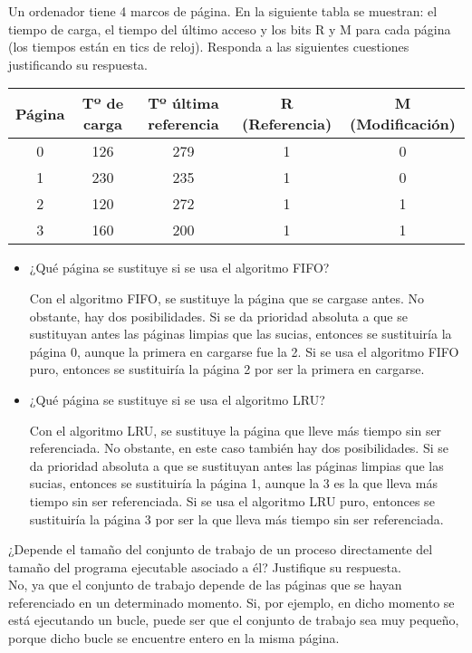 \begin{ejercicio}
Un ordenador tiene 4 marcos de página. En la siguiente tabla se muestran: el tiempo de carga, el tiempo del último acceso y los bits R y M para cada página (los tiempos están en tics de reloj). Responda a las siguientes cuestiones justificando su respuesta.

\begin{table}[H]
    \begin{tabular}{|c|c|c|c|c|}
        \hline
        Página & Tº de carga & Tº última referencia & R (Referencia) & M (Modificación) \\
        \hline
        0 & 126 & 279 & 1 & 0 \\
        1 & 230 & 235 & 1 & 0 \\
        2 & 120 & 272 & 1 & 1 \\
        3 & 160 & 200 & 1 & 1 \\
        \hline
    \end{tabular}
\end{table}

\begin{itemize}
    \item ¿Qué página se sustituye si se usa el algoritmo FIFO?
    
    Con el algoritmo FIFO, se sustituye la página que se cargase antes.
    No obstante, hay dos posibilidades. Si se da prioridad absoluta a que se sustituyan antes las páginas limpias que las sucias, entonces se sustituiría la página 0, aunque
    la primera en cargarse fue la 2. Si se usa el algoritmo FIFO puro, entonces se sustituiría la página 2 por ser la primera en cargarse.

    \item ¿Qué página se sustituye si se usa el algoritmo LRU?
    
    Con el algoritmo LRU, se sustituye la página que lleve más tiempo sin ser referenciada.
    No obstante, en este caso también hay dos posibilidades.
    Si se da prioridad absoluta a que se sustituyan antes las páginas limpias que las sucias, entonces se sustituiría la página 1, aunque la 3 es la que lleva más tiempo sin ser referenciada.
    Si se usa el algoritmo LRU puro, entonces se sustituiría la página 3 por ser la que lleva más tiempo sin ser referenciada.
\end{itemize}
\end{ejercicio}

\begin{ejercicio}
¿Depende el tamaño del conjunto de trabajo de un proceso directamente del
tamaño del programa ejecutable asociado a él? Justifique su respuesta.\\

No, ya que el conjunto de trabajo depende de las páginas que se hayan referenciado en un determinado momento.
Si, por ejemplo, en dicho momento se está ejecutando un bucle, puede ser que el conjunto de trabajo sea muy pequeño,
porque dicho bucle se encuentre entero en la misma página.
\end{ejercicio}

